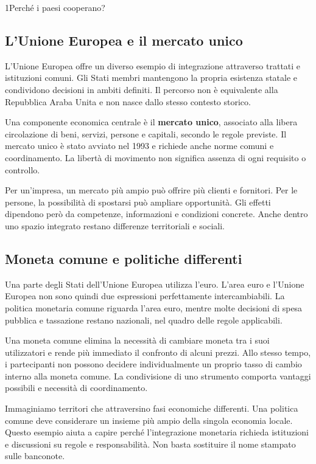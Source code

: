 \begin{lettura}{1}{Perché i paesi cooperano?}
\subsection*{L'Unione Europea e il mercato unico}
L'Unione Europea offre un diverso esempio di integrazione attraverso trattati e istituzioni comuni. Gli Stati membri mantengono la propria esistenza statale e condividono decisioni in ambiti definiti. Il percorso non è equivalente alla Repubblica Araba Unita e non nasce dallo stesso contesto storico.

Una componente economica centrale è il \textbf{mercato unico}, associato alla libera circolazione di beni, servizi, persone e capitali, secondo le regole previste. Il mercato unico è stato avviato nel 1993 e richiede anche norme comuni e coordinamento. La libertà di movimento non significa assenza di ogni requisito o controllo.

Per un'impresa, un mercato più ampio può offrire più clienti e fornitori. Per le persone, la possibilità di spostarsi può ampliare opportunità. Gli effetti dipendono però da competenze, informazioni e condizioni concrete. Anche dentro uno spazio integrato restano differenze territoriali e sociali.

\subsection*{Moneta comune e politiche differenti}
Una parte degli Stati dell'Unione Europea utilizza l'euro. L'area euro e l'Unione Europea non sono quindi due espressioni perfettamente intercambiabili. La politica monetaria comune riguarda l'area euro, mentre molte decisioni di spesa pubblica e tassazione restano nazionali, nel quadro delle regole applicabili.

Una moneta comune elimina la necessità di cambiare moneta tra i suoi utilizzatori e rende più immediato il confronto di alcuni prezzi. Allo stesso tempo, i partecipanti non possono decidere individualmente un proprio tasso di cambio interno alla moneta comune. La condivisione di uno strumento comporta vantaggi possibili e necessità di coordinamento.

Immaginiamo territori che attraversino fasi economiche differenti. Una politica comune deve considerare un insieme più ampio della singola economia locale. Questo esempio aiuta a capire perché l'integrazione monetaria richieda istituzioni e discussioni su regole e responsabilità. Non basta sostituire il nome stampato sulle banconote.


\end{lettura}
